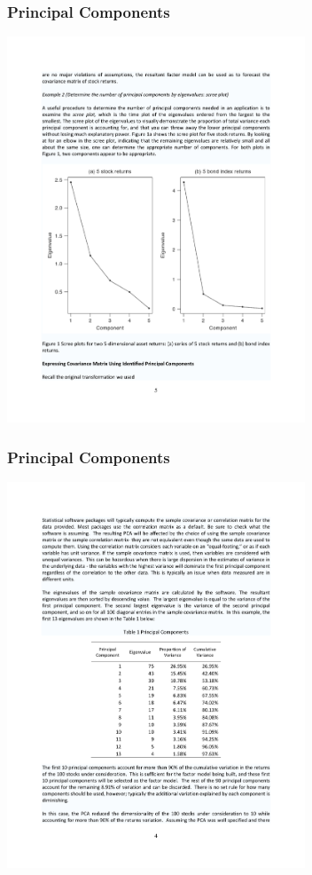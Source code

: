 \begin{frame}
\frametitle{Principal Components}
\begin{center}
\includegraphics[width=3.5in]{./resources/princomp1}
\end{center}
\end{frame}

\begin{frame}
\frametitle{Principal Components}
\begin{center}
\includegraphics[width=3.5in]{./resources/princomp2}
\end{center}
\end{frame}

